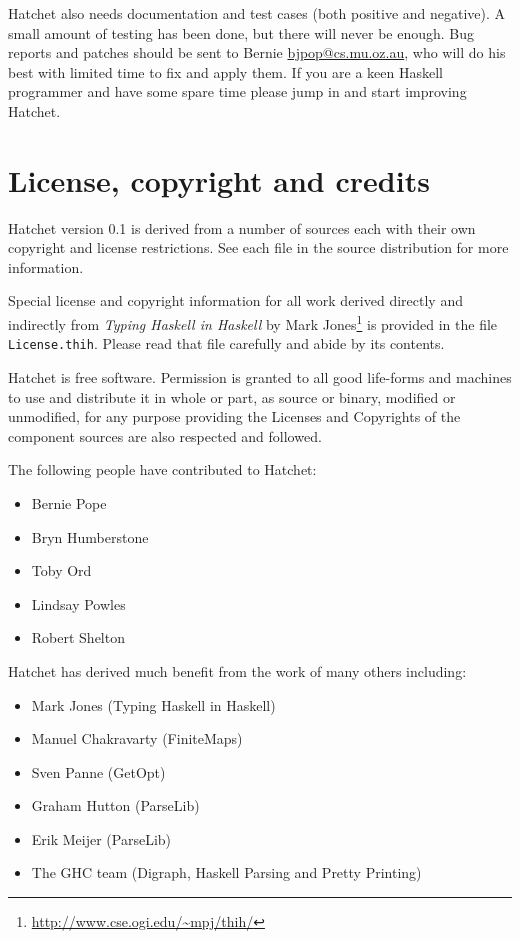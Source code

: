 \documentclass{article}
\begin{document}
Hatchet also needs documentation and test cases (both positive and negative).
A small amount of testing has been done, but there will never be enough.
Bug reports and patches should be sent to Bernie \url{bjpop@cs.mu.oz.au},
who will do his best with limited time to fix and apply them.
If you are a keen Haskell programmer and have some spare time
please jump in and start improving Hatchet.

\section{License, copyright and credits}

Hatchet version 0.1 is derived from a number of sources
each with their own copyright and license restrictions.
See each file in the source distribution for more 
information.

Special license and copyright information for all work
derived directly and indirectly from \emph{Typing Haskell
in Haskell} by 
Mark Jones\footnote{\url{http://www.cse.ogi.edu/~mpj/thih/}}
is provided in the file \texttt{License.thih}. Please read
that file carefully and abide by its contents.

Hatchet is free software. Permission is granted to
all good life-forms and machines to use and distribute
it in whole or part, as source or binary, modified or
unmodified, for any purpose providing the Licenses
and Copyrights of the component sources are also
respected and followed.

The following people have contributed to Hatchet:
\begin{itemize}
\item Bernie Pope     
\item Bryn Humberstone
\item Toby Ord
\item Lindsay Powles
\item Robert Shelton
\end{itemize}

Hatchet has derived much benefit from the work of 
many others including:

\begin{itemize}
\item Mark Jones         (Typing Haskell in Haskell) 
\item Manuel Chakravarty (FiniteMaps) 
\item Sven Panne         (GetOpt) 
\item Graham Hutton      (ParseLib) 
\item Erik Meijer        (ParseLib) 
\item The GHC team       (Digraph, Haskell Parsing and Pretty Printing)
\end{itemize}
\end{document}
